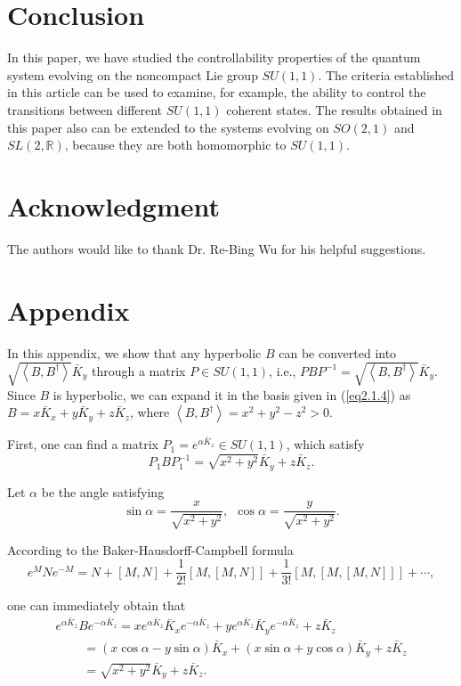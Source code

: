 \documentclass[onecolumn,showpacs,showkeys,preprintnumbers]{revtex4}
\begin{document}
\section{Conclusion}\label{sec6}

In this paper, we have studied the controllability properties of
the quantum system evolving on the noncompact Lie group $SU(1,1)$.
The criteria established in this article can be used to examine,
for example, the ability to control the transitions between
different $SU(1,1)$ coherent states. The results obtained in this
paper also can be extended to the systems evolving on $SO(2,1)$
and $SL(2,\mathbb{R})$, because they are both homomorphic to
$SU(1,1)$.

\section*{Acknowledgment}

The authors would like to thank Dr. Re-Bing Wu for his helpful
suggestions.

\appendix
\section*{Appendix}
In this appendix, we show that any hyperbolic $B$ can be converted
into $\sqrt{\left<B,B^\dag\right>}\bar{K}_y$ through a matrix
$P{\in}SU(1,1)$, i.e.,
$PBP^{-1}=\sqrt{\left<B,B^\dag\right>}\bar{K}_y$. Since $B$ is
hyperbolic, we can expand it in the basis given in (\ref{eq2.1.4})
as $B=x\bar{K}_x+y\bar{K}_y+z\bar{K}_z$, where
$\left<B,B^\dag\right>=x^2+y^2-z^2>0$.

First, one can find a matrix
$P_1=e^{\alpha\bar{K}_z}{\in}SU(1,1)$, which satisfy\noindent\begin{equation}\label{eqa.1}P_1BP_1^{-1}=\sqrt{x^2+y^2}\bar{K}_y+z\bar{K}_z.
\end{equation}

\noindent Let $\alpha$ be the angle satisfying\noindent\begin{equation}\label{eqa.2}\sin\alpha=\frac{x}{\sqrt{x^2+y^2}},~~\cos\alpha=\frac{y}{\sqrt{x^2+y^2}}.
\end{equation}

\noindent According to the Baker-Hausdorff-Campbell formula\noindent\begin{equation}\label{eqa.3}e^{M}Ne^{-M}=N+[M,N]+\frac{1}{2!}[M,[M,N]]+\frac{1}{3!}[M,[M,[M,N]]]+\cdots,
\end{equation}

\noindent one can immediately obtain that
\noindent\begin{equation}\label{eqa.4}\begin{array}{l}
   e^{\alpha\bar{K}_z}Be^{-\alpha\bar{K}_z}=xe^{\alpha\bar{K}_z}\bar{K}_xe^{-\alpha\bar{K}_z}+ye^{\alpha\bar{K}_z}\bar{K}_ye^{-\alpha\bar{K}_z}+z\bar{K}_z\\
   ~~~~~~~~~~=(x\cos\alpha-y\sin\alpha)\bar{K}_x+(x\sin\alpha+y\cos\alpha)\bar{K}_y+z\bar{K}_z\\
   ~~~~~~~~~~=\sqrt{x^2+y^2}\bar{K}_y+z\bar{K}_z.
\end{array}
\end{equation}
\end{document}
